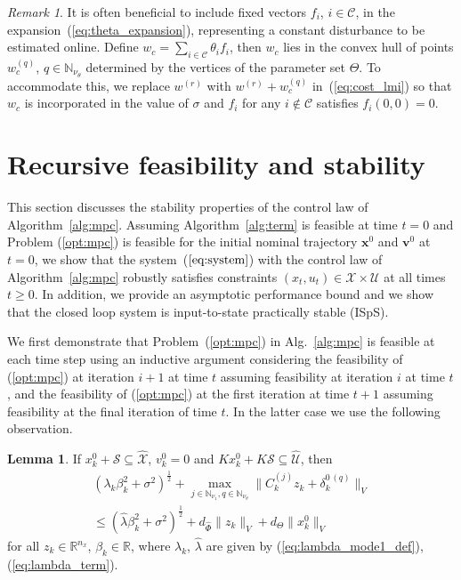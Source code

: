 \documentclass{IEEEtran}
\theoremstyle{definition}
\newtheorem{lemma}{Lemma}
\theoremstyle{remark}
\newtheorem{remark}{Remark}
\begin{document}
\begin{remark}\label{rem_const_basis_function}
It is often beneficial to include fixed vectors \( f_i \), \( i \in \mathcal{C} \), in the expansion~(\ref{eq:theta_expansion}), representing a constant disturbance to be estimated online. Define \( w_c = \sum_{i \in \mathcal{C}} \theta_i f_i \), then \( w_c \) lies in the convex hull of points \( w_c^{(q)} \), \( q \in \mathbb{N}_{\nu_\theta} \) determined by the vertices of the parameter set \( \Theta \).
%
To accommodate this, we replace \( w^{(r)} \) with \( w^{(r)} + w_c^{(q)} \) in~(\ref{eq:cost_lmi}) so that \( w_c \) is incorporated in the value of $\sigma$ and $f_i$ for any $i\not\in\mathcal{C}$ satisfies $f_i(0,0)=0$.
\end{remark}

\section{Recursive feasibility and stability}\label{sec:stability}

This section discusses the stability properties of the control law of Algorithm~\ref{alg:mpc}. 
Assuming Algorithm~\ref{alg:term} is feasible at time $t=0$ and Problem (\ref{opt:mpc}) is feasible for the initial nominal trajectory $\mathbf{x}^0$ and $\mathbf{v}^0$ at $t=0$, we show that the system~($\ref{eq:system}$) with the control law of Algorithm~\ref{alg:mpc} robustly satisfies constraints $(x_t,u_t)\in\mathcal{X}\times\mathcal{U}$ at all times $t \geq 0$. In addition, we provide an asymptotic performance bound and we show that the closed loop system is input-to-state practically stable (ISpS).

We first demonstrate that Problem~(\ref{opt:mpc}) in Alg.~\ref{alg:mpc} is feasible at each time step using an inductive argument considering the feasibility of (\ref{opt:mpc}) at iteration $i+1$ at time $t$ assuming  feasibility at iteration $i$ at time $t$, and the feasibility of (\ref{opt:mpc}) at the first iteration at time $t+1$ assuming feasibility at the final iteration of time $t$. In the latter case we use the following observation. 

\begin{lemma}\label{lem:beta_dynamics_term_bound}
If 
$x^0_k + \mathcal{S} \subseteq \hat{\mathcal{X}}$, $v^0_k=0$ and $Kx^0_k + K \mathcal{S} \subseteq \hat{\mathcal{U}}$, then 
\begin{multline}\label{eq:beta_dynamics_term_bound}
(\lambda_k \beta_k^2 + \sigma^2)^{\frac{1}{2}} + \max_{j\in\mathbb{N}_{\nu_1}, q\in\mathbb{N}_{\nu_\theta}} \lVert C^{(j)}_k z_k + \delta^{0\,(q)}_k \rVert_V\\
\leq
(\hat{\lambda}\beta_k^2 + \sigma^2)^{\frac{1}{2}} + d_{\hat{\Phi}} \|z_k\|_V + d_\Theta \| x^0_k \|_V
\end{multline}
for all $z_k\in\mathbb{R}^{n_x}$\!, $\beta_k\in\mathbb{R}$,  where $\lambda_k$, $\hat{\lambda}$ are given by (\ref{eq:lambda_mode1_def}), (\ref{eq:lambda_term}).
\end{lemma}
\end{document}
